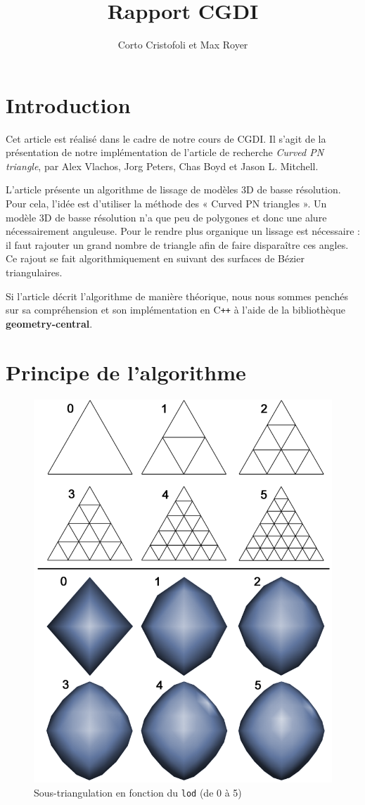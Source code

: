 \documentclass{article}
\title{Rapport CGDI}
\author{Corto Cristofoli et Max Royer}
\def\Cpp{C\texttt{++} }
\begin{document}
\maketitle



\section{Introduction}
Cet article est réalisé dans le cadre de notre cours de CGDI.
Il s'agit de la présentation de notre implémentation de l'article
de recherche \textit{Curved PN triangle}, par Alex Vlachos, Jorg Peters,
Chas Boyd et Jason L. Mitchell.

L'article présente un algorithme de lissage de modèles 3D de basse résolution.
Pour cela, l'idée est d'utiliser la méthode des « Curved PN triangles ». Un
modèle 3D de basse résolution n'a que peu de polygones et donc une alure
nécessairement anguleuse. Pour le rendre plus organique un lissage est
nécessaire : il faut rajouter un grand nombre de triangle afin de faire
disparaître ces angles. Ce rajout se fait algorithmiquement en suivant des
surfaces de Bézier triangulaires.

Si l'article décrit l'algorithme de manière théorique, nous nous sommes penchés
sur sa compréhension et son implémentation en \Cpp à l'aide de la
bibliothèque \textbf{geometry-central}.


\section{Principe de l'algorithme}

\begin{figure}[ht!]
\centering
    \includegraphics[width=0.4\linewidth]{lod}
    \caption{Sous-triangulation en fonction du \texttt{lod} (de 0 à 5)}
    \label{fig:lod}
\end{figure}
\end{document}
